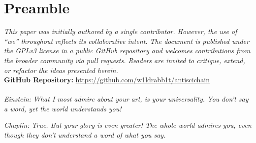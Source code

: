\section*{Preamble}
\textit{This paper was initially authored by a single contributor. However, the use of “we” throughout reflects its collaborative intent. The document is published under the GPLv3 license in a public GitHub repository and welcomes contributions from the broader community via pull requests. Readers are invited to critique, extend, or refactor the ideas presented herein.}
\\
\textbf{GitHub Repository:} \url{https://github.com/w1ldrabb1t/antiscichain}
\\
\\
\emph{Einstein: What I most admire about your art, is your universality. You don’t say a word, yet the world understands you!}

\emph{Chaplin: True. But your glory is even greater! The whole world admires you, even though they don’t understand a word of what you say.}